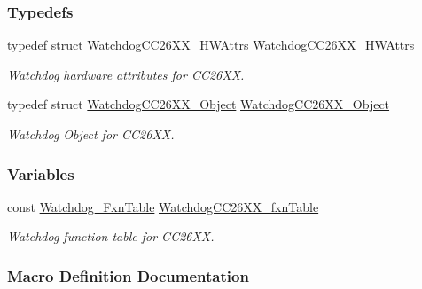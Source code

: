 \subsubsection*{Typedefs}
\begin{DoxyCompactItemize}
\item 
typedef struct \hyperlink{struct_watchdog_c_c26_x_x___h_w_attrs}{Watchdog\+C\+C26\+X\+X\+\_\+\+H\+W\+Attrs} \hyperlink{_watchdog_c_c26_x_x_8h_a3c5c1fb8e79e0ffbefbc0c6077490157}{Watchdog\+C\+C26\+X\+X\+\_\+\+H\+W\+Attrs}
\begin{DoxyCompactList}\small\item\em Watchdog hardware attributes for C\+C26\+X\+X. \end{DoxyCompactList}\item 
typedef struct \hyperlink{struct_watchdog_c_c26_x_x___object}{Watchdog\+C\+C26\+X\+X\+\_\+\+Object} \hyperlink{_watchdog_c_c26_x_x_8h_a1974637ff573d5fb1e141f263ac5361f}{Watchdog\+C\+C26\+X\+X\+\_\+\+Object}
\begin{DoxyCompactList}\small\item\em Watchdog Object for C\+C26\+X\+X. \end{DoxyCompactList}\end{DoxyCompactItemize}
\subsubsection*{Variables}
\begin{DoxyCompactItemize}
\item 
const \hyperlink{struct_watchdog___fxn_table}{Watchdog\+\_\+\+Fxn\+Table} \hyperlink{_watchdog_c_c26_x_x_8h_a1f60b940055d37c5bf8545499e948ca3}{Watchdog\+C\+C26\+X\+X\+\_\+fxn\+Table}
\begin{DoxyCompactList}\small\item\em Watchdog function table for C\+C26\+X\+X. \end{DoxyCompactList}\end{DoxyCompactItemize}


\subsubsection{Macro Definition Documentation}
